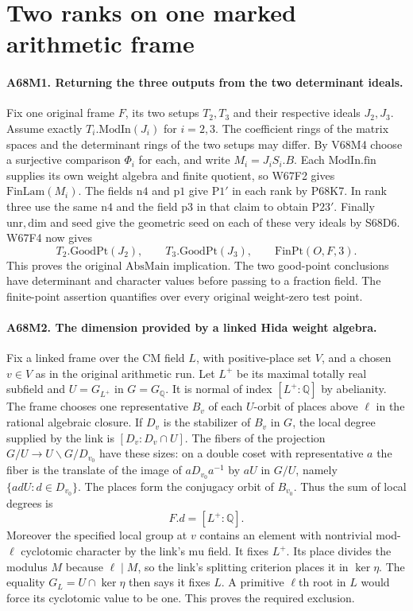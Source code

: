 \section{Two ranks on one marked arithmetic frame}

\paragraph{A68M1. Returning the three outputs from the two determinant ideals.}
Fix one original frame $F$, its two setups $T_2,T_3$ and their
respective ideals $J_2,J_3$. Assume exactly
$T_i.\mathrm{ModIn}(J_i)$ for $i=2,3$. The coefficient rings of the
matrix spaces and the determinant rings of the two setups may differ.
By V68M4 choose a surjective comparison $\Phi_i$ for each, and
write $M_i=J_i S_i.B$. Each $\mathrm{ModIn.fin}$ supplies its own
weight algebra and finite quotient, so W67F2 gives
$\mathrm{FinLam}(M_i)$. The fields $\mathrm{n4}$ and $\mathrm{p1}$
give $\mathrm{P1}'$ in each rank by P68K7. In rank three use the
same $\mathrm{n4}$ and the field $\mathrm{p3}$ in that claim to
obtain $\mathrm{P23}'$. Finally $\mathrm{unr},\mathrm{dim}$ and
$\mathrm{seed}$ give the geometric seed on each of these very ideals
by S68D6. W67F4 now gives
\[
 T_2.\mathrm{GoodPt}(J_2),\qquad T_3.\mathrm{GoodPt}(J_3),
       \qquad \mathrm{FinPt}(O,F,3).
\]
This proves the original $\mathrm{AbsMain}$ implication. The two
good-point conclusions have determinant and character values before
passing to a fraction field. The finite-point assertion quantifies
over every original weight-zero test point.

\paragraph{A68M2. The dimension provided by a linked Hida weight algebra.}
Fix a linked frame over the CM field $L$, with positive-place set
$V$, and a chosen $v\in V$ as in the original arithmetic run.
Let $L^+$ be its maximal totally real subfield and $U=G_{L^+}$
in $G=G_{\mathbb Q}$. It is normal of index $[L^+:\mathbb Q]$
by abelianity. The frame chooses one representative $B_v$ of
each $U$-orbit of places above $\ell$ in the rational algebraic
closure. If $D_v$ is the stabilizer of $B_v$ in $G$, the local
degree supplied by the link is $[D_v:D_v\cap U]$.
The fibers of the projection $G/U\to U\backslash G/D_{v_0}$
have these sizes: on a double coset with representative $a$ the fiber
is the translate of the image of $aD_{v_0}a^{-1}$ by $aU$
in $G/U$, namely $\{adU:d\in D_{v_0}\}$. The places form the
conjugacy orbit of $B_{v_0}$. Thus the sum of local degrees is
\[
                          F.d=[L^+:\mathbb Q].
\]
Moreover the specified local group at $v$ contains an element
with nontrivial mod-$\ell$ cyclotomic character by the link's
$\mathrm{mu}$ field. It fixes $L^+$. Its place divides the modulus
$M$ because $\ell\mid M$, so the link's splitting criterion places
it in $\ker\eta$. The equality $G_L=U\cap\ker\eta$ then says it
fixes $L$. A primitive $\ell$th root in $L$ would force its
cyclotomic value to be one. This proves the required exclusion.

